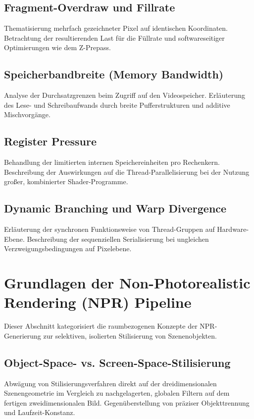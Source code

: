 \subsection{Fragment-Overdraw und Fillrate}
\label{subsec:020201_fragment_overdraw_and_fillrate}
Thematisierung mehrfach gezeichneter Pixel auf identischen Koordinaten. Betrachtung der resultierenden Last für die Füllrate und softwareseitiger Optimierungen wie dem Z-Prepass.

\subsection{Speicherbandbreite (Memory Bandwidth)}
\label{subsec:020202_memory_bandwidth_limitations}
Analyse der Durchsatzgrenzen beim Zugriff auf den Videospeicher. Erläuterung des Lese- und Schreibaufwands durch breite Pufferstrukturen und additive Mischvorgänge.

\subsection{Register Pressure}
\label{subsec:020203_register_pressure_limitations}
Behandlung der limitierten internen Speichereinheiten pro Rechenkern. Beschreibung der Auswirkungen auf die Thread-Parallelisierung bei der Nutzung großer, kombinierter Shader-Programme.

\subsection{Dynamic Branching und Warp Divergence}
\label{subsec:020204_dynamic_branching_and_warp_divergence}
Erläuterung der synchronen Funktionsweise von Thread-Gruppen auf Hardware-Ebene. Beschreibung der sequenziellen Serialisierung bei ungleichen Verzweigungsbedingungen auf Pixelebene.


\section{Grundlagen der Non-Photorealistic Rendering (NPR) Pipeline}
\label{sec:0203_non_photorealistic_rendering_fundamentals}

Dieser Abschnitt kategorisiert die raumbezogenen Konzepte der NPR-Generierung zur selektiven, isolierten Stilisierung von Szenenobjekten.

\subsection{Object-Space- vs. Screen-Space-Stilisierung}
\label{subsec:020301_object_space_vs_screen_space_stylization}
Abwägung von Stilisierungsverfahren direkt auf der dreidimensionalen Szenengeometrie im Vergleich zu nachgelagerten, globalen Filtern auf dem fertigen zweidimensionalen Bild. Gegenüberstellung von präziser Objekttrennung und Laufzeit-Konstanz.